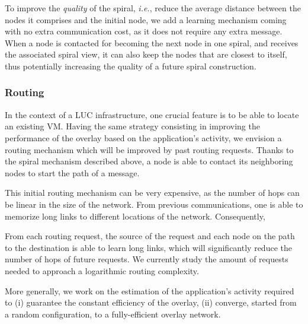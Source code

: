 To improve the \emph{quality} of the spiral, \emph{i.e.}, reduce the average
distance between the nodes it comprises and the initial node, we add a learning
mechanism coming with no extra communication cost, as it does not require any
extra message. When a node is contacted for becoming the next node in one
spiral, and receives the associated spiral view, it can also keep the nodes that
are closest to itself, thus potentially increasing the quality of a future
spiral construction.

\subsubsection*{Routing}

In the context of a LUC infrastructure, one crucial feature is to be able to
locate an existing VM. Having the same strategy consisting in improving the
performance of the overlay based on the application's activity, we envision a
routing mechanism which will be improved by past routing requests. Thanks to the
spiral mechanism described above, a node is able to contact its neighboring
nodes to start the path of a message.

This initial routing mechanism can be very expensive, as the number of hops can
be linear in the size of the network. From previous communications, one is able
to memorize long links to different locations of the network. Consequently, 

From each routing request, the source of the request and each node on the path
to the destination is able to learn long links, which will significantly reduce
the number of hops of future requests. We currently study the amount of requests
needed to approach a logarithmic routing complexity.

More generally, we work on the estimation of the application's activity required
to (i) guarantee the constant efficiency of the overlay, (ii) converge, started
from a random configuration, to a fully-efficient overlay network.



